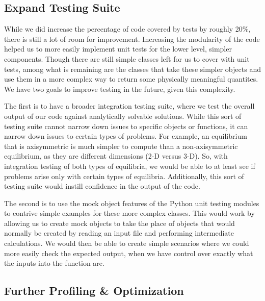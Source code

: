 \documentclass{article}
\begin{document}
\subsection{Expand Testing Suite}

While we did increase the percentage of code covered by tests by roughly 20\%, there is still a lot of room for improvement.
Increasing the modularity of the code helped us to more easily implement unit tests for the lower level, simpler components.
Though there are still simple classes left for us to cover with unit tests, among what is remaining are the classes that take these simpler objects and use them in a more complex way to return some physically meaningful quantites.
We have two goals to improve testing in the future, given this complexity.

The first is to have a broader integration testing suite, where we test the overall output of our code against analytically solvable solutions.
While this sort of testing suite cannot narrow down issues to specific objects or functions, it can narrow down issues to certain types of problems.
For example, an equilibrium that is axisymmetric is much simpler to compute than a non-axisymmetric equilibrium, as they are different dimensions (2-D versus 3-D).
So, with integration testing of both types of equilibria, we would be able to at least see if problems arise only with certain types of equilibria.
Additionally, this sort of testing suite would instill confidence in the output of the code.

The second is to use the mock object features of the Python unit testing modules to contrive simple examples for these more complex classes.
This would work by allowing us to create mock objects to take the place of objects that would normally be created by reading an input file and performing intermediate calculations.
We would then be able to create simple scenarios where we could more easily check the expected output, when we have control over exactly what the inputs into the function are.

\subsection{Further Profiling \& Optimization}
\end{document}
